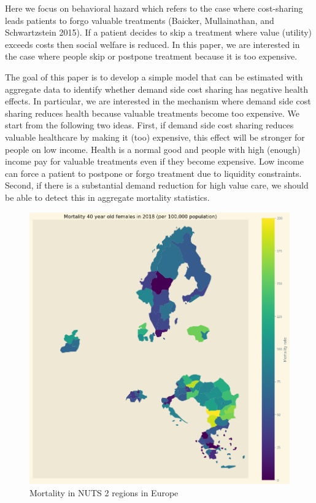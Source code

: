 \documentclass[a4paper,12pt]{article}
\makeatletter
\newcommand{\citeprocitem}[2]{\hyper@linkstart{cite}{citeproc_bib_item_#1}#2\hyper@linkend}
\makeatother
\begin{document}
Here we focus on behavioral hazard which refers to the case where cost-sharing leads patients to forgo valuable treatments (\citeprocitem{2}{Baicker, Mullainathan, and Schwartzstein 2015}). If a patient decides to skip a treatment where value (utility) exceeds costs then social welfare is reduced. In this paper, we are interested in the case where people skip or postpone treatment because it is too expensive.

The goal of this paper is to develop a simple model that can be estimated with aggregate data to identify whether demand side cost sharing has negative health effects. In particular, we are interested in the mechanism where demand side cost sharing reduces health because valuable treatments become too expensive. We start from the following two ideas. First, if demand side cost sharing reduces valuable healthcare by making it (too) expensive, this effect will be stronger for people on low income. Health is a normal good and people with high (enough) income pay for valuable treatments even if they become expensive. Low income can force a patient to postpone or forgo treatment due to liquidity constraints. Second, if there is a substantial demand reduction for high value care, we should be able to detect this in aggregate mortality statistics.

\begin{figure}[htbp]
\centering
\includegraphics[width=.9\linewidth]{./figures/Europe_mortality_40_F_2018.png}
\caption{\label{fig:EUmap}Mortality in NUTS 2 regions in Europe}
\end{figure}
\end{document}
